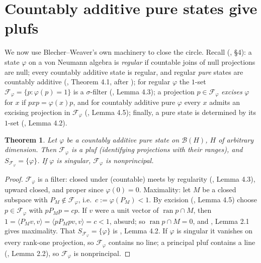 \documentclass[11pt,reqno]{amsart}
\newtheorem{theorem}{Theorem}[section]
\theoremstyle{definition}
\newcommand{\FF}{\mathcal{F}}
\begin{document}
\section{Countably additive pure states give plufs}\label{sec:J}

We now use Blecher--Weaver's own machinery to close the circle. Recall
(\cite{BlecherWeaver}, \S4): a state $\varphi$ on a von Neumann algebra is
\emph{regular} if countable joins of null projections are null; every countably
additive state is regular, and regular \emph{pure} states are countably additive
(\cite{BlecherWeaver}, Theorem 4.1, after \cite{Hamhalter}); for regular $\varphi$ the
$1$-set $\FF_\varphi=\{p:\varphi(p)=1\}$ is a $\sigma$-filter (\cite{BlecherWeaver},
Lemma 4.3); a projection $p\in\FF_\varphi$ \emph{excises} $\varphi$ for $x$ if
$pxp=\varphi(x)p$, and for countably additive pure $\varphi$ every $x$ admits an
excising projection in $\FF_\varphi$ (\cite{BlecherWeaver}, Lemma 4.5); finally, a pure
state is determined by its $1$-set (\cite{BlecherWeaver}, Lemma 4.2).

\begin{theorem}\label{thm:J}
Let $\varphi$ be a countably additive pure state on $\mathcal B(H)$, $H$ of arbitrary
dimension. Then $\FF_\varphi$ is a pluf (identifying projections with their ranges),
and $S_{\FF_\varphi}=\{\varphi\}$. If $\varphi$ is singular, $\FF_\varphi$ is
nonprincipal.
\end{theorem}

\begin{proof}
$\FF_\varphi$ is a filter: closed under (countable) meets by regularity
(\cite{BlecherWeaver}, Lemma 4.3), upward closed, and proper since
$\varphi(0)=0$. Maximality: let $M$ be a closed subspace with $P_M\notin\FF_\varphi$,
i.e.\ $c:=\varphi(P_M)<1$. By excision (\cite{BlecherWeaver}, Lemma 4.5) choose
$p\in\FF_\varphi$ with $pP_Mp=cp$. If $v$ were a unit vector of
$\operatorname{ran}p\cap M$, then
$1=\langle P_Mv,v\rangle=\langle pP_Mpv,v\rangle=c<1$, absurd; so
$\operatorname{ran}p\cap M=0$, and \cite{FWI}, Lemma 2.1 gives maximality. That
$S_{\FF_\varphi}=\{\varphi\}$ is \cite{BlecherWeaver}, Lemma 4.2. If $\varphi$ is
singular it vanishes on every rank-one projection, so $\FF_\varphi$ contains no line;
a principal pluf contains a line (\cite{FWI}, Lemma 2.2), so $\FF_\varphi$ is
nonprincipal.
\end{proof}
\end{document}
